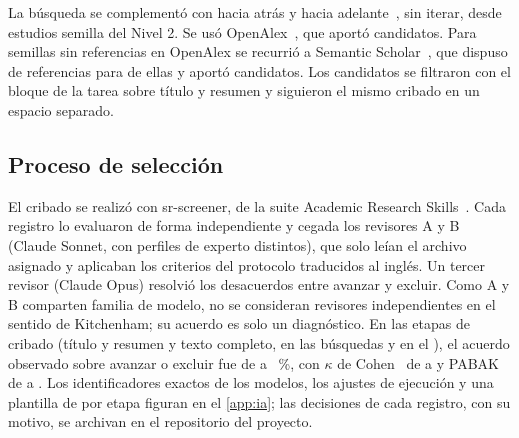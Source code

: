 La búsqueda se complementó con  hacia atrás y hacia adelante~\cite{Wohlin2014Snowballing}, sin iterar, desde \nBolaSemillas{} estudios semilla del Nivel 2. Se usó OpenAlex~\cite{Priem2022OpenAlex}, que aportó \nBolaCandOA{} candidatos. Para \nBolaSemillasSS{} semillas sin referencias en OpenAlex se recurrió a Semantic Scholar~\cite{Kinney2023SemanticScholar}, que dispuso de referencias para \nBolaSemillasSSrefs{} de ellas y aportó \nBolaCandSS{} candidatos. Los candidatos se filtraron con el bloque de la tarea sobre título y resumen y siguieron el mismo cribado en un espacio separado.

\subsection{Proceso de selección}
\label{sec:met-seleccion}

El cribado se realizó con sr-screener, de la suite Academic Research Skills~\cite{ARS2026}. Cada registro lo evaluaron de forma independiente y cegada los revisores A y B (Claude Sonnet, con perfiles de experto distintos), que solo leían el archivo asignado y aplicaban los criterios del protocolo traducidos al inglés. Un tercer revisor (Claude Opus) resolvió los desacuerdos entre avanzar y excluir. Como A y B comparten familia de modelo, no se consideran revisores independientes en el sentido de Kitchenham; su acuerdo es solo un diagnóstico. En las \nEtapasCribado{} etapas de cribado (título y resumen y texto completo, en las búsquedas y en el ), el acuerdo observado sobre avanzar o excluir fue de \acuerdoCribMin{} a \acuerdoCribMax~\%, con $\kappa$ de Cohen~\cite{Cohen1960Coefficient} de \kappaCribMin{} a \kappaCribMax{} y PABAK~\cite{Byrt1993Bias} de \pabakCribMin{} a \pabakCribMax{}. Los identificadores exactos de los modelos, los ajustes de ejecución y una plantilla de  por etapa figuran en el \cref{app:ia}; las decisiones de cada registro, con su motivo, se archivan en el repositorio del proyecto.

